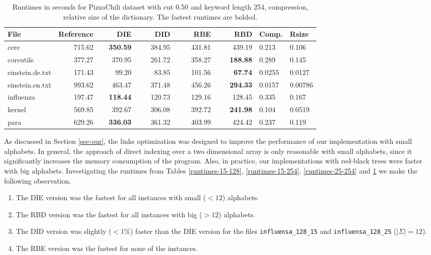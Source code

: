 \documentclass[english,twoside,censored,csm,algorithms-track-2020]{HYthesisML}
\theoremstyle{plain}
\theoremstyle{definition}
\numberwithin{testexample}{chapter}
\begin{document}
\begin{center}
  \begin{table}
  \begin{tabular} {| l |r r r r r|l l|}
    \hline
    \textbf{File} & \textbf{Reference} & ~~~~\textbf{DIE} & ~~~~\textbf{DID} & ~~~~\textbf{RBE} & ~~~~\textbf{RBD} & \textbf{Comp.} & \textbf{Rsize} \\
    \hline
    cere & 715.62 & \textbf{350.59} & 384.95 & 431.81 & 439.19            & 0.213  & 0.106   \\
    coreutils & 377.27 & 370.95 & 261.72 & 358.27 & \textbf{188.88}       & 0.289  & 0.145   \\
    einstein.de.txt & 171.43 & 99.20 & 83.85 & 101.56 & \textbf{67.74}    & 0.0255 & 0.0127  \\
    einstein.en.txt & 993.62 & 463.47 & 371.48 & 456.26 & \textbf{294.33} & 0.0157 & 0.00786 \\
    influenza & 197.47 & \textbf{118.44} & 120.73 & 129.16 & 128.45       & 0.335  & 0.167   \\
    kernel & 569.85 & 392.67 & 306.08 & 392.72 & \textbf{241.98}          & 0.104  & 0.0519  \\
    para & 629.26 & \textbf{336.03} & 361.32 & 403.99 & 424.42            & 0.237  & 0.119   \\
    \hline
  \end{tabular}
  \caption{Runtimes in seconds for PizzaChili dataset with cut 0.50 and keyword length 254, compression, relative size of the dictionary. The fastest runtimes are bolded.}
  \label{runtimes-50-254}
  \end{table}
\end{center}

\vspace{-4cm}
As discussed in Section \ref{sec-our}, the links optimization was designed to improve the performance
of our implementation with small alphabets. In general, the approach of direct indexing over a two
dimensional array is only reasonable with small alphabets, since it significantly increases
the memory consumption of the program. Also, in practice, our implementations with red-black trees
were faster with big alphabets. Investigating the runtimes from Tables \ref{runtimes-15-128},
\ref{runtimes-15-254}, \ref{runtimes-25-254} and \ref{runtimes-50-254} we make the following observation.

\begin{enumerate}
\item The DIE version was the fastest for all instances with small ($<12$) alphabets.
\item The RBD version was the fastest for all instances with big ($>12$) alphabets.
\item The DID version was slightly ($<1\%$) faster than the DIE version for the files \texttt{influensa\_128\_15} and \texttt{influensa\_128\_25} ($|\Sigma| = 12$).
\item The RBE version was the fastest for none of the instances.
\end{enumerate}
\end{document}
